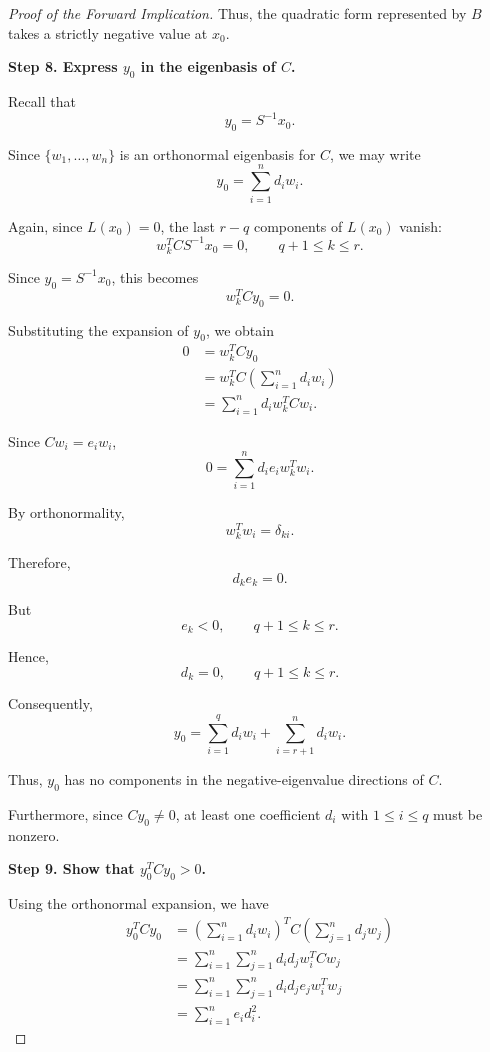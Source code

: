 \documentclass[11pt]{article}
\theoremstyle{definition}
\theoremstyle{remark}
\begin{document}
\begin{proof}[Proof of the Forward Implication]
Thus, the quadratic form represented
by $B$ takes a strictly negative
value at $x_0$.

\medskip

\textbf{Step 8. Express $y_0$ in the eigenbasis of $C$.}

Recall that
\[
    y_0=S^{-1}x_0.
\]

Since $\{w_1,\ldots,w_n\}$ is an
orthonormal eigenbasis for $C$,
we may write
\[
    y_0=\sum_{i=1}^{n}d_iw_i.
\]

Again, since $L(x_0)=0$, the last
$r-q$ components of $L(x_0)$ vanish:
\[
    w_k^TCS^{-1}x_0=0,
    \qquad q+1\leq k\leq r.
\]

Since $y_0=S^{-1}x_0$, this becomes
\[
    w_k^TCy_0=0.
\]

Substituting the expansion of $y_0$,
we obtain
\[
\begin{aligned}
    0
    &=w_k^TCy_0\\
    &=w_k^TC
      \left(\sum_{i=1}^{n}d_iw_i\right)\\
    &=\sum_{i=1}^{n}d_iw_k^TCw_i.
\end{aligned}
\]

Since $Cw_i=e_iw_i$,
\[
    0=\sum_{i=1}^{n}d_ie_iw_k^Tw_i.
\]

By orthonormality,
\[
    w_k^Tw_i=\delta_{ki}.
\]

Therefore,
\[
    \boxed{d_ke_k=0}.
\]

But
\[
    e_k<0,
    \qquad q+1\leq k\leq r.
\]

Hence,
\[
    \boxed{
    d_k=0,\qquad q+1\leq k\leq r.
    }
\]

Consequently,
\[
    \boxed{
    y_0=
    \sum_{i=1}^{q}d_iw_i
    +
    \sum_{i=r+1}^{n}d_iw_i.
    }
\]

Thus, $y_0$ has no components in
the negative-eigenvalue directions
of $C$.

Furthermore, since $Cy_0\neq 0$,
at least one coefficient $d_i$
with $1\leq i\leq q$ must be nonzero.

\medskip

\textbf{Step 9. Show that $y_0^TCy_0>0$.}

Using the orthonormal expansion,
we have
\[
\begin{aligned}
    y_0^TCy_0
    &=
    \left(\sum_{i=1}^{n}d_iw_i\right)^T
    C\left(\sum_{j=1}^{n}d_jw_j\right)\\
    &=
    \sum_{i=1}^{n}
    \sum_{j=1}^{n}
    d_id_jw_i^TCw_j\\
    &=
    \sum_{i=1}^{n}
    \sum_{j=1}^{n}
    d_id_je_jw_i^Tw_j\\
    &=
    \sum_{i=1}^{n}e_id_i^2.
\end{aligned}
\]


\end{proof}
\end{document}
